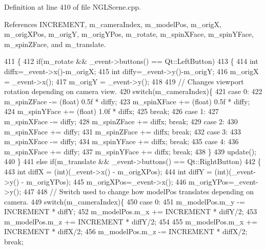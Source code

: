 Definition at line 410 of file N\-G\-L\-Scene.\-cpp.



References I\-N\-C\-R\-E\-M\-E\-N\-T, m\-\_\-camera\-Index, m\-\_\-model\-Pos, m\-\_\-orig\-X, m\-\_\-orig\-X\-Pos, m\-\_\-orig\-Y, m\-\_\-orig\-Y\-Pos, m\-\_\-rotate, m\-\_\-spin\-X\-Face, m\-\_\-spin\-Y\-Face, m\-\_\-spin\-Z\-Face, and m\-\_\-translate.


\begin{DoxyCode}
411 \{
412   \textcolor{keywordflow}{if}(m_rotate && \_event->buttons() == Qt::LeftButton)
413   \{
414     \textcolor{keywordtype}{int} diffx=\_event->x()-m_origX;
415     \textcolor{keywordtype}{int} diffy=\_event->y()-m_origY;
416     m_origX = \_event->x();
417     m_origY = \_event->y();
418 
419     \textcolor{comment}{// Changes viewport rotation depending on camera view.}
420     \textcolor{keywordflow}{switch}(m_cameraIndex)\{
421       \textcolor{keywordflow}{case} 0:
422         m_spinZFace -= (float) 0.5f * diffy;
423         m_spinXFace += (float) 0.5f * diffy;
424         m_spinYFace += (float) 1.0f * diffx;
425         \textcolor{keywordflow}{break};
426       \textcolor{keywordflow}{case} 1:
427         m_spinXFace -= diffy;
428         m_spinZFace += diffx; \textcolor{keywordflow}{break};
429       \textcolor{keywordflow}{case} 2:
430         m_spinXFace += diffy;
431         m_spinZFace += diffx; \textcolor{keywordflow}{break};
432       \textcolor{keywordflow}{case} 3:
433         m_spinXFace -= diffy;
434         m_spinYFace += diffx; \textcolor{keywordflow}{break};
435       \textcolor{keywordflow}{case} 4:
436         m_spinXFace += diffy;
437         m_spinYFace += diffx; \textcolor{keywordflow}{break};
438     \}
439     update();
440   \}
441   \textcolor{keywordflow}{else} \textcolor{keywordflow}{if}(m_translate && \_event->buttons() == Qt::RightButton)
442   \{
443     \textcolor{keywordtype}{int} diffX = (int)(\_event->x() - m_origXPos);
444     \textcolor{keywordtype}{int} diffY = (int)(\_event->y() - m_origYPos);
445     m_origXPos=\_event->x();
446     m_origYPos=\_event->y();
447 
448     \textcolor{comment}{// Switch used to change how modelPos translates depending on camera.}
449     \textcolor{keywordflow}{switch}(m_cameraIndex)\{
450     \textcolor{keywordflow}{case} 0:
451         m_modelPos.m\_y -= INCREMENT * diffY;
452         m_modelPos.m\_x += INCREMENT * diffY/2;
453         m_modelPos.m\_z += INCREMENT * diffY/2;
454 
455         m_modelPos.m\_x += INCREMENT * diffX/2;
456         m_modelPos.m\_z -= INCREMENT * diffX/2; \textcolor{keywordflow}{break};

\end{DoxyCode}
